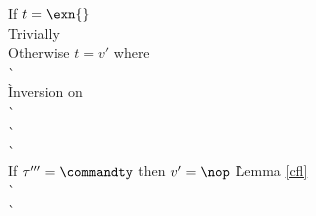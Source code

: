 \begin{description}
\begin{tabbing}
  If $t = \exn{}$ \+ \\
    Trivially  \- \\
  Otherwise $t = v'$ where  \+ \\
      \`  \\
      \` Inversion on  \\
      \`  \\
      \`  \\
      \`  \\
    If $\tau''' = \commandty$ then $v' = \nop$
      \` Lemma \ref{cfl} \\
      \`  \\
      \`  \- \\
  \end{tabbing}

\item[\rulesteppushcallfn] \ \\


\end{description}
